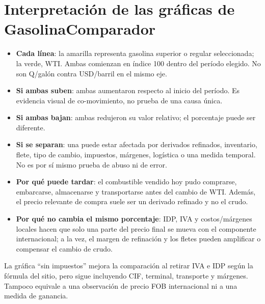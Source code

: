 \documentclass[11pt,letterpaper]{article}
\begin{document}
\section{Interpretación de las gráficas de GasolinaComparador}
\begin{itemize}
  \item \textbf{Cada línea}: la amarilla representa gasolina superior o regular seleccionada; la verde, WTI. Ambas comienzan en índice 100 dentro del período elegido. No son Q/galón contra USD/barril en el mismo eje.
  \item \textbf{Si ambas suben}: ambas aumentaron respecto al inicio del período. Es evidencia visual de co-movimiento, no prueba de una causa única.
  \item \textbf{Si ambas bajan}: ambas redujeron su valor relativo; el porcentaje puede ser diferente.
  \item \textbf{Si se separan}: una puede estar afectada por derivados refinados, inventario, flete, tipo de cambio, impuestos, márgenes, logística o una medida temporal. No es por sí mismo prueba de abuso ni de error.
  \item \textbf{Por qué puede tardar}: el combustible vendido hoy pudo comprarse, embarcarse, almacenarse y transportarse antes del cambio de WTI. Además, el precio relevante de compra suele ser un derivado refinado y no el crudo.
  \item \textbf{Por qué no cambia el mismo porcentaje}: IDP, IVA y costos/márgenes locales hacen que solo una parte del precio final se mueva con el componente internacional; a la vez, el margen de refinación y los fletes pueden amplificar o compensar el cambio de crudo.
\end{itemize}

La gráfica ``sin impuestos'' mejora la comparación al retirar IVA e IDP según la fórmula del sitio, pero sigue incluyendo CIF, terminal, transporte y márgenes. Tampoco equivale a una observación de precio FOB internacional ni a una medida de ganancia.
\end{document}
